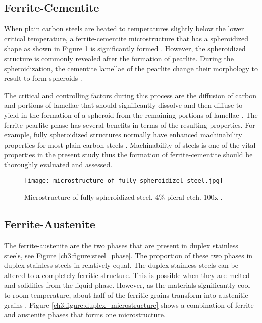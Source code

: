 \subsection{Ferrite-Cementite}
When plain carbon steels are heated to temperatures slightly below the lower critical temperature, a ferrite-cementite microstructure that has a spheroidized shape as shown in Figure \ref{ch3:figure:spheroidized_steel} is significantly formed \cite{molabe2018determining}. However, the spheroidized structure is commonly revealed after the formation of pearlite. During the spheroidization, the cementite lamellae of the pearlite change their morphology to result to form spheroids \cite{molabe2018determining}.

The critical and controlling factors during this process are the diffusion of carbon and portions of lamellae that should significantly dissolve and then diffuse to yield in the formation of a spheroid from the remaining portions of lamellae \cite{molabe2018determining}. The ferrite-pearlite phase has several benefits in terms of the resulting properties. For example, fully spheroidized structures normally have enhanced machinability properties for most plain carbon steels \cite{molabe2018determining}.  Machinability of steels is one of the vital properties in the present study thus the formation of ferrite-cementite should be thoroughly evaluated and assessed.

\begin{figure}[H]
    \centering
    \texttt{[image: microstructure\_of\_fully\_spheroidizel\_steel.jpg]}
    \caption{Microstructure of fully spheroidized steel. 4\% picral etch. 100x \cite{molabe2018determining}.}
    \label{ch3:figure:spheroidized_steel}
\end{figure}

\subsection{Ferrite-Austenite}
The ferrite-austenite are the two phases that are present in duplex stainless steels, see Figure \ref{ch3:figure:steel_phase}. The proportion of these two phases in duplex stainless steels in relatively equal. The duplex stainless steels can be altered to a completely ferritic structure. This is possible when they are melted and solidifies from the liquid phase\cite{xiao2006challenge}.  However, as the materials significantly cool to room temperature, about half of the ferritic grains transform into austenitic grains \cite{steels3practical}. Figure \ref{ch3:figure:duplex_microstructure} shows a combination of ferrite and austenite phases that forms one microstructure.


